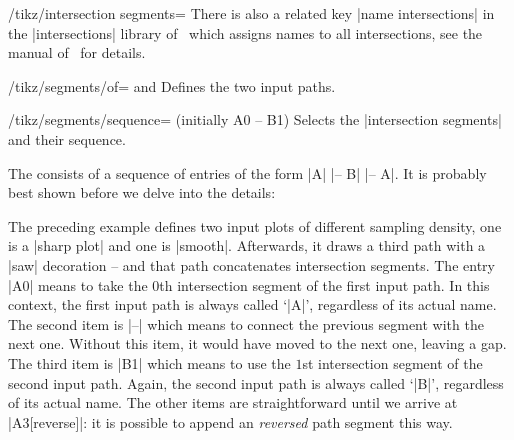 {\begin{key}{/tikz/intersection segments=}
	There is also a related key |name intersections| in the |intersections| library of \tikzname\ which assigns names to all intersections, see the manual of \tikzname\ for details.
\end{key}

\begin{key}{/tikz/segments/of= and }
	Defines the two input paths.
\end{key}

\begin{key}{/tikz/segments/sequence= (initially A0 -- B1)}
	Selects the |intersection segments| and their sequence.

	The  consists of a sequence of entries of the form |A| |-- B| |-- A|. It is probably best shown before we delve into the details:
\begin{codeexample}[]
\end{codeexample}
	The preceding example defines two input plots of different sampling density, one is a |sharp plot| and one is |smooth|. Afterwards, it draws a third path with a |saw| decoration -- and that path concatenates intersection segments. The entry |A0| means to take the $0$th intersection segment of the first input path. In this context, the first input path is always called `|A|', regardless of its actual name. The second item is |--| which means to connect the previous segment with the next one. Without this item, it would have moved to the next one, leaving a gap. The third item is |B1| which means to use the $1$st intersection segment of the second input path. Again, the second input path is always called `|B|', regardless of its actual name. The other items are straightforward until we arrive at |A3[reverse]|: it is possible to append an \emph{reversed} path segment this way.


\end{key}}
